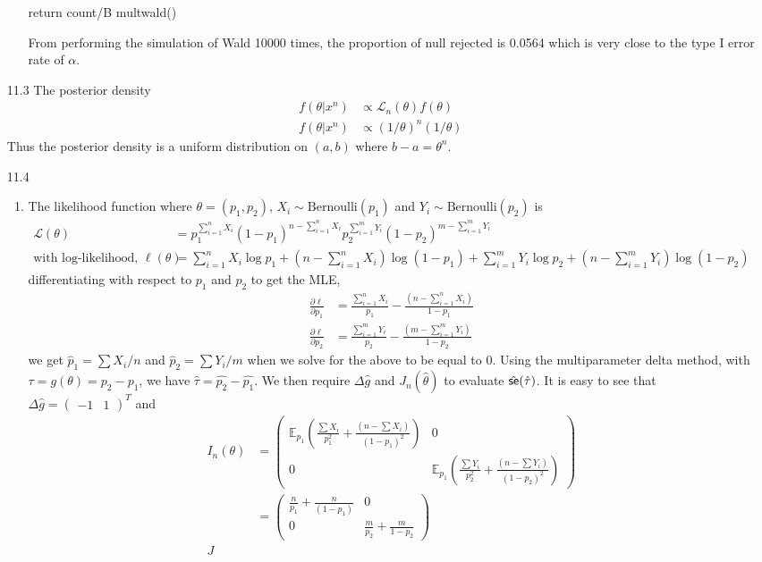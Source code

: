\documentclass[a4paper,10pt]{article}
\theoremstyle{definition}
\begin{document}
\begin{enumerate}
\begin{enumerate}[(a)]
\begin{python}
    return count/B
multwald()            
\end{python}
From performing the simulation of Wald 10000 times, the proportion of null rejected is 0.0564 which is very close to the type I error rate of $\alpha$.
\end{enumerate}
\item[11.3] The posterior density 
\begin{align*}
f(\theta|x^n) &\propto \mathcal{L}_n(\theta)f(\theta)\\
f(\theta|x^n) &\propto (1/\theta)^n(1/\theta)
\end{align*}
Thus the posterior density is a uniform distribution on $(a,b)$ where $b-a=\theta^n$.
\item[11.4]
\begin{enumerate}
\item The likelihood function where $\theta = (p_1, p_2)$, $X_i \sim \text{Bernoulli}(p_1)$  and $Y_i \sim \text{Bernoulli}(p_2)$ is 
\begin{align*}
\mathcal{L}(\theta)&=p_1^{\sum_{i=1}^{n} X_i}(1-p_1)^{n - \sum_{i=1}^{n} X_i}p_2^{\sum_{i=1}^{m} Y_i}(1-p_2)^{m-\sum_{i=1}^{m} Y_i}\\
\text{with log-likelihood, } \ell(\theta) &=\sum_{i=1}^{n} X_i \log p_1 + \left(n - \sum_{i=1}^{n} X_i\right) \log (1-p_1) +\sum_{i=1}^{m} Y_i \log p_2 + \left(n - \sum_{i=1}^{m} Y_i\right) \log (1-p_2)
\end{align*}
differentiating with respect to $p_1$ and $p_2$ to get the {\sffamily MLE},
\begin{align*}
\frac{\partial \ell}{\partial p_1} &= \frac{\sum_{i=1}^{n} X_i}{p_1} - \frac{\left(n - \sum_{i=1}^{n} X_i\right)}{1-p_1}\\
\frac{\partial \ell}{\partial p_2} &= \frac{\sum_{i=1}^{m} Y_i}{p_2} - \frac{\left(m - \sum_{i=1}^{m} Y_i\right)}{1-p_2}
\end{align*}
we get $\hat{p}_1 = \sum X_i /n$ and $\hat{p}_2 = \sum Y_i /m$ when we solve for the above to be equal to 0. Using the multiparameter delta method, with $\tau = g(\theta) = p_2-p_1$, we have $\hat{\tau} = \hat{p_2} - \hat{p_1}$. We then require $\Delta \hat{g}$ and $J_n(\hat{\theta})$ to evaluate $\hat{\text{\sffamily se}}(\hat{\tau})$. It is easy to see that $\Delta \hat{g} = \begin{pmatrix}-1 & 1\end{pmatrix}^T$ and 
\begin{align*}
I_n(\theta) &= \begin{pmatrix} \mathbb{E}_{p_1}\left(\frac{\sum X_i}{p_1^2}+\frac{\left(n - \sum X_i\right)}{(1-p_1)^2}\right) & 0 \\ 0 & \mathbb{E}_{p_1}\left(\frac{\sum Y_i}{p_2^2}+\frac{\left(n - \sum Y_i\right)}{(1-p_2)^2}\right)\end{pmatrix}\\
&= \begin{pmatrix} \frac{n}{p_1}+\frac{n}{(1-p_1)} & 0 \\ 0 & \frac{m}{p_2}+\frac{m}{1-p_2}\end{pmatrix}\\
J
\end{align*}



\end{enumerate}
\end{enumerate}
\end{document}
